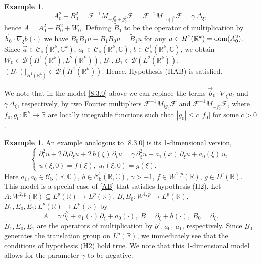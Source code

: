 \documentclass[11pt]{amsart}
\numberwithin{equation}{section}
\newcommand\R{\mathbb R}
\newcommand{\RR}{{\mathbb R}}
\newcommand{\CC}{{\mathbb C}}
\newcommand{\rmb}{{\mathrm{b}}}
\theoremstyle{remark}
\theoremstyle{definition}
\newtheorem{example}[theorem]{Example}
\newcommand\cC{{\mathcal C}}
\newcommand{\dom}{\text{\rm{dom}}}
\begin{document}
\begin{example}
\begin{equation}
		A_0^2-B_0^2 = \mathcal{F}^{-1} M_{-f_0^2 + g_0^2} \mathcal{F}
		= \mathcal{F}^{-1} M_{-\gamma|\cdot|^2} \mathcal{F}
		= \gamma\,\Delta_\xi,
	\end{equation}
	hence $A = A_0^2-B_0^2+ W_0$. Defining $\widetilde{B}_1$ to be the operator of multiplication
	by $\vec{b}_0\cdot\nabla_\xi b(\cdot)$ we have $B_0 B_1 u - B_1 B_0 u = \widetilde{B}_1 u$ for any
	$u \in H^2(\R^k) = \dom(A_0^2)$. Since $\vec{a} \in \cC_\rmb(\RR^k,\CC^k)$, $a_0 \in \cC_\rmb(\RR^k,\CC)$, $b \in \cC^1_\rmb (\RR^k,\CC)$,
	we obtain $W_0 \in \mathcal{B}(H^1(\R^k), L^2(\R^k))$,
	$B_1, \widetilde{B}_1 \in \mathcal{B}(L^2(\R^k))$,
	$(B_1)\big|_{H^1(\R^k)} \in \mathcal{B}(H^1(\R^k))$. Hence,  Hypothesis (HAB) is
	satisfied. 
\end{example}	
We note that in the model \eqref{8.3.0} above we can replace the terms $\vec{b}_0\cdot\nabla_\xi u_t$
and $\gamma\,\Delta_\xi$, respectively, by two Fourier multipliers
$\mathcal{F}^{-1} M_{ig_0} \mathcal{F}$ and $\mathcal{F}^{-1} M_{-f_0^2} \mathcal{F}$,
where $f_0, g_0: \R^k \to \R$ are locally integrable functions  
such that $|g_0| \leq \tilde{c}\,|f_0|$ for some $\tilde{c} > 0$.	
\begin{example}\label{e8.4}
	An example analogous to \eqref{8.3.0} is its 1-dimensional version,
	\begin{equation}\label{eq:11}
		\begin{cases}
			\partial_t^2 u + 2\,\partial_t\partial_\xi u + 2\,b(\xi)\,\partial_t u
			= \gamma\,\partial_\xi^2 u + a_1(x)\,\partial_\xi u + a_0(\xi)\,u,\\
			u(\xi,0) = f(\xi),\; u_t(\xi,0) = g(\xi).
		\end{cases}
	\end{equation}	
	Here $a_1, a_0 \in \cC_\rmb(\RR,\CC)$, $b \in \cC^1_\rmb(\RR,\CC)$, $\gamma > -1$,
	$f \in W^{1,p}(\R)$, $g \in L^p(\R)$. This model is a special case of \eqref{AB} that satisfies hypothesis (H2). Let $A: W^{2,p}(\R) \subseteq L^p(\R) \to L^p(\R)$,
	$B, B_0: W^{1,p} \to L^p(\R)$, $\widetilde{B}_1, E_0, E_1: L^p(\R) \to L^p(\R)$ by
	\begin{equation}\label{8.4.1}
		A = \gamma\,\partial_\xi^2 + a_1(\cdot)\,\partial_\xi + a_0(\cdot),\;
		B = \partial_\xi + b(\cdot),\;
		B_0 = \partial_\xi.
	\end{equation}
	$\widetilde{B}_1, E_0, E_1$ are the operators of multiplication by $b'$, $a_0$, $a_1$,
	respectively. Since $B_0$ generates the translation group on $L^p(\R)$, we immediately see
	that the conditions of hypothesis (H2) hold true.
	We note that this 1-dimensional model allows for the parameter $\gamma$ to be negative.	
\end{example}
\end{document}
